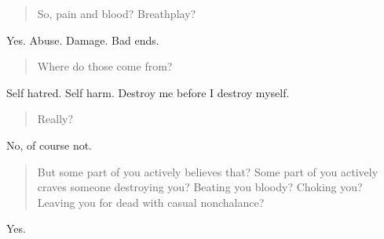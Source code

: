 \begin{quote}
So, pain and blood? Breathplay?
\end{quote}

Yes. Abuse. Damage. Bad ends.

\begin{quote}
Where do those come from?
\end{quote}

Self hatred. Self harm. Destroy me before I destroy myself.

\begin{quote}
Really?
\end{quote}

No, of course not.

\begin{quote}
But some part of you actively believes that? Some part of you actively craves someone destroying you? Beating you bloody? Choking you? Leaving you for dead with casual nonchalance?
\end{quote}

Yes.
